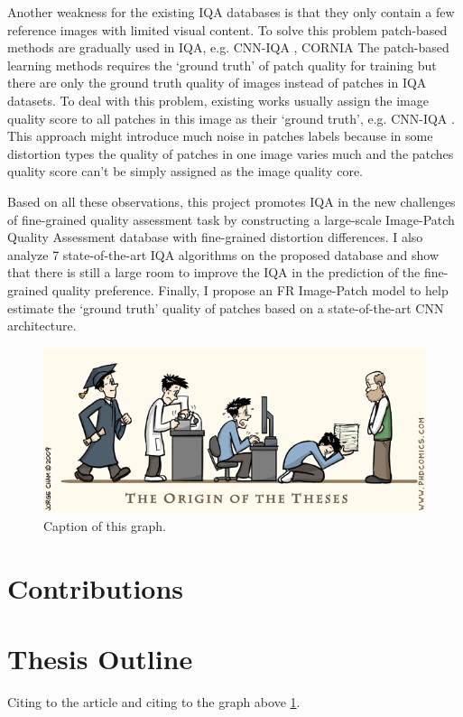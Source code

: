 Another weakness for the existing IQA databases is that
they only contain a few reference images with limited visual content. 
To solve this problem patch-based methods are gradually used in IQA, e.g. CNN-IQA \cite{Kang2014}, CORNIA \cite{Ye2012}
The patch-based learning methods requires the \enquote*{ground truth} of patch quality for training
but there are only the ground truth quality of images instead
of patches in IQA datasets.
To deal with this problem, existing works usually assign the image quality score to all patches
in this image as their \enquote*{ground truth}, e.g. CNN-IQA \cite{Kang2014}. 
This approach might introduce much noise in patches labels because in some distortion types the quality of patches in one
image varies much and the patches quality score can’t be
simply assigned as the image quality core. 

Based on all these observations, this project promotes IQA in the new challenges of fine-grained quality assessment task by constructing a large-scale Image-Patch Quality Assessment database with fine-grained distortion differences. I also analyze 7 state-of-the-art IQA algorithms on the proposed database and show that there is still a large room to improve the IQA in the prediction of the fine-grained quality preference. Finally, I propose an FR Image-Patch model to help estimate the \enquote*{ground truth} quality of patches based on a state-of-the-art CNN architecture.   
   
\begin{figure}[h!]
  \includegraphics[width=\linewidth]{charts/writing-thesis.png}
  \caption{Caption of this graph.}
  \label{fig:writing-thesis}
\end{figure}

\section{Contributions}


\section{Thesis Outline}

Citing to the article \cite{Baroni1983} and citing to the graph above \ref{fig:writing-thesis}.